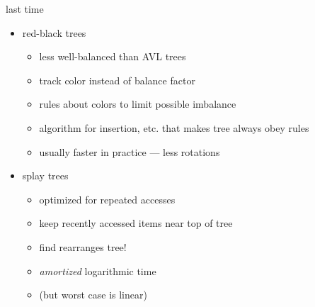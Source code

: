 \begin{frame}{last time}
    \begin{itemize}
    \item red-black trees
        \begin{itemize}
        \item less well-balanced than AVL trees
        \item track color instead of balance factor
        \item rules about colors to limit possible imbalance
        \item algorithm for insertion, etc. that makes tree always obey rules
        \item usually faster in practice --- less rotations
        \end{itemize}
    \item splay trees
        \begin{itemize}
        \item optimized for repeated accesses
        \item keep recently accessed items near top of tree
        \item find rearranges tree!
        \item \textit{amortized} logarithmic time
        \item (but worst case is linear)
        \end{itemize}
    \end{itemize}
\end{frame}
